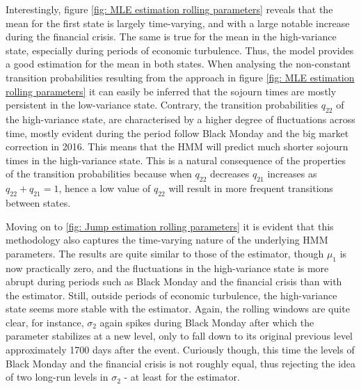 Interestingly, figure \ref{fig: MLE estimation rolling parameters} reveals that the mean for the first state is largely time-varying, and with a large notable increase during the financial crisis. The same is true for the mean in the high-variance state, especially during periods of economic turbulence. Thus, the model provides a good estimation for the mean in both states. When analysing the non-constant transition probabilities resulting from the \mle approach in figure \ref{fig: MLE estimation rolling parameters} it can easily be inferred that the sojourn times are mostly persistent in the low-variance state. Contrary, the transition probabilities $q_{22}$ of the high-variance state, are characterised by a higher degree of fluctuations across time, mostly evident during the period follow Black Monday and the big market correction in 2016. This means that the HMM will predict much shorter sojourn times in the high-variance state. This is a natural consequence of the properties of the transition probabilities because when $q_{22}$ decreases $q_{21}$ increases as $q_{22} + q_{21} = 1$, hence a low value of $q_{22}$ will result in more frequent transitions between states.

Moving on to \cref{fig: Jump estimation rolling parameters} it is evident that this methodology also captures the time-varying nature of the underlying HMM parameters. The results are quite similar to those of the \mle estimator, though $\mu_1$ is now practically zero, and the fluctuations in the high-variance state is more abrupt during periods such as Black Monday and the financial crisis than with the \mle estimator. Still, outside periods of economic turbulence, the high-variance state seems more stable with the \jump estimator. Again, the rolling windows are quite clear, for instance, $\sigma_2$ again spikes during Black Monday after which the parameter stabilizes at a new level, only to fall down to its original previous level approximately 1700 days after the event. Curiously though, this time the levels of Black Monday and the financial crisis is not roughly equal, thus rejecting the idea of two long-run levels in $\sigma_2$ - at least for the \jump estimator. 

